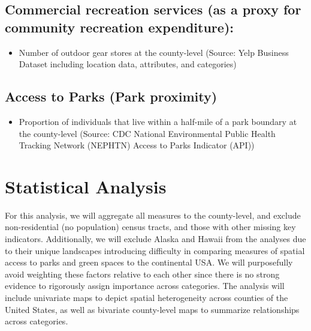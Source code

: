 \documentclass{article}
\begin{document}
\subsection{ \textbf{Commercial recreation services (as a proxy for community recreation expenditure):}}
\begin{itemize}
\item Number of outdoor gear stores at the county-level (Source: Yelp Business Dataset including location data, attributes, and categories)
\end{itemize}


\subsection{\textbf{Access to Parks (Park proximity)}}
\begin{itemize}
\item Proportion of individuals that live within a half-mile of a park boundary at the county-level (Source: CDC National Environmental Public Health Tracking Network (NEPHTN) Access to Parks Indicator (API))
\end{itemize}

\section{\textbf{Statistical Analysis}}

For this analysis, we will aggregate all measures to the county-level, and exclude non-residential (no population) census tracts, and those with other missing key indicators. Additionally, we will exclude Alaska and Hawaii from the analyses due to their unique landscapes introducing difficulty in comparing measures of spatial access to parks and green spaces to the continental USA. We will purposefully avoid weighting these factors relative to each other since there is no strong evidence to rigorously assign importance across categories. The analysis will include univariate maps to depict spatial heterogeneity across counties of the United States, as well as bivariate county-level maps to summarize relationships across categories. 
\end{document}
